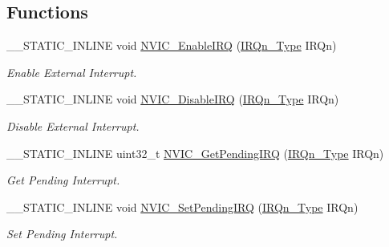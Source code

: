 \subsection*{Functions}
\begin{DoxyCompactItemize}
\item 
\+\_\+\+\_\+\+S\+T\+A\+T\+I\+C\+\_\+\+I\+N\+L\+I\+NE void \mbox{\hyperlink{group___c_m_s_i_s___core___n_v_i_c_functions_ga3349f2e3580d7ce22d6530b7294e5921}{N\+V\+I\+C\+\_\+\+Enable\+I\+RQ}} (\mbox{\hyperlink{group___peripheral__interrupt__number__definition_ga7e1129cd8a196f4284d41db3e82ad5c8}{I\+R\+Qn\+\_\+\+Type}} I\+R\+Qn)
\begin{DoxyCompactList}\small\item\em Enable External Interrupt. \end{DoxyCompactList}\item 
\+\_\+\+\_\+\+S\+T\+A\+T\+I\+C\+\_\+\+I\+N\+L\+I\+NE void \mbox{\hyperlink{group___c_m_s_i_s___core___n_v_i_c_functions_ga260fba04ac8346855c57f091d4ee1e71}{N\+V\+I\+C\+\_\+\+Disable\+I\+RQ}} (\mbox{\hyperlink{group___peripheral__interrupt__number__definition_ga7e1129cd8a196f4284d41db3e82ad5c8}{I\+R\+Qn\+\_\+\+Type}} I\+R\+Qn)
\begin{DoxyCompactList}\small\item\em Disable External Interrupt. \end{DoxyCompactList}\item 
\+\_\+\+\_\+\+S\+T\+A\+T\+I\+C\+\_\+\+I\+N\+L\+I\+NE uint32\+\_\+t \mbox{\hyperlink{group___c_m_s_i_s___core___n_v_i_c_functions_gafec8042db64c0f8ed432b6c8386a05d8}{N\+V\+I\+C\+\_\+\+Get\+Pending\+I\+RQ}} (\mbox{\hyperlink{group___peripheral__interrupt__number__definition_ga7e1129cd8a196f4284d41db3e82ad5c8}{I\+R\+Qn\+\_\+\+Type}} I\+R\+Qn)
\begin{DoxyCompactList}\small\item\em Get Pending Interrupt. \end{DoxyCompactList}\item 
\+\_\+\+\_\+\+S\+T\+A\+T\+I\+C\+\_\+\+I\+N\+L\+I\+NE void \mbox{\hyperlink{group___c_m_s_i_s___core___n_v_i_c_functions_ga3ecf446519da33e1690deffbf5be505f}{N\+V\+I\+C\+\_\+\+Set\+Pending\+I\+RQ}} (\mbox{\hyperlink{group___peripheral__interrupt__number__definition_ga7e1129cd8a196f4284d41db3e82ad5c8}{I\+R\+Qn\+\_\+\+Type}} I\+R\+Qn)
\begin{DoxyCompactList}\small\item\em Set Pending Interrupt. \end{DoxyCompactList}\item 

\end{DoxyCompactItemize}
